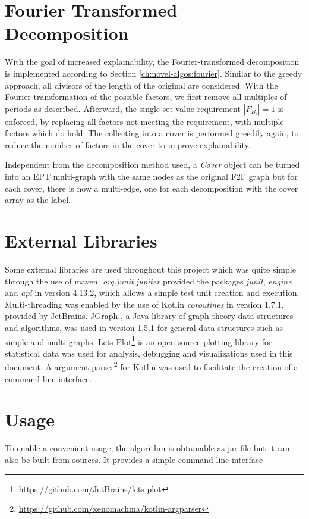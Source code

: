 \section{Fourier Transformed Decomposition}
\label{ch:Implementation:fourier-transform}
With the goal of increased explainability, the Fourier-transformed decomposition is implemented according to Section \ref{ch:novel-algos:fourier}.
Similar to the greedy approach, all divisors of the length of the original \DFA are considered.
With the Fourier-transformation of the possible factors, we first remove all multiples of periods as described.
Afterward, the single set value requirement $|F_{B_i}| = 1$ is enforced, by replacing all factors not meeting the requirement, with multiple factors which do hold.
The collecting into a cover is performed greedily again, to reduce the number of factors in the cover to improve explainability.

Independent from the decomposition method used, a \textit{Cover} object can be turned into an EPT multi-graph with the same nodes as the original F2F graph but for each cover, there is now a multi-edge, one for each decomposition with the cover array as the label.

\section{External Libraries}
\label{ch:Implementation:external-libs}
Some external libraries are used throughout this project which was quite simple through the use of maven.
\emph{org.junit.jupiter} provided the packages \emph{junit}, \emph{engine} and \emph{api} in version 4.13.2, which allows a simple test unit creation and execution. Multi-threading was enabled by the use of Kotlin \emph{coroutines} in version 1.7.1, provided by JetBrains.
JGraph \cite{DBLP:journals/corr/abs-1904-08355}, a Java library of graph theory data structures and algorithms, was used in version 1.5.1 for general data structures such as simple and multi-graphs.
Lets-Plot\footnote{\url{https://github.com/JetBrains/lets-plot}} is an open-source plotting library for statistical data was used for analysis, debugging and visualizations used in this document.
A argument parser\footnote{\url{https://github.com/xenomachina/kotlin-argparser}} for Kotlin was used to facilitate the creation of a command line interface.

\section{Usage}
\label{ch:Implementation:usage}
To enable a convenient usage, the algorithm is obtainable as jar file but it can also be built from sources. It provides a simple command line interface

